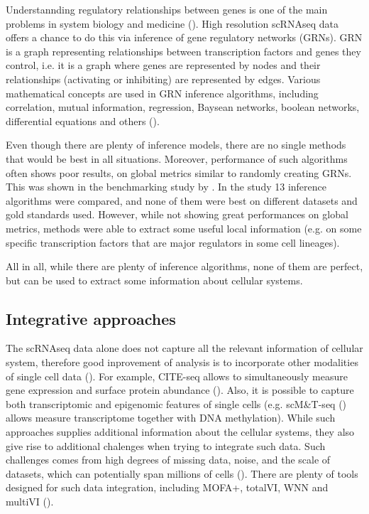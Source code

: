 Understannding regulatory relationships between genes is one of the main problems in system biology and medicine (\cite{Lamoline2024}).
High resolution scRNAseq data offers a chance to do this via inference of gene regulatory networks (GRNs).
GRN is a graph representing relationships between transcription factors and genes they control,
i.e. it is a graph where genes are represented by nodes and their relationships (activating or inhibiting) are represented by edges.
Various mathematical concepts are used in GRN inference algorithms, including
correlation, mutual information, regression, Baysean networks, boolean networks, differential equations and others (\cite{Akers2021}).

Even though there are plenty of inference models, there are no single methods that would be best in all situations.
Moreover, performance of such algorithms often shows poor results, on global metrics similar to randomly creating GRNs.
This was shown in the benchmarking study by \textcite{McCalla2023}.
In the study 13 inference algorithms were compared, and none of them were best on different datasets and gold standards used.
However, while not showing great performances on global metrics, methods were able to extract some useful local information
(e.g. on some specific transcription factors that are major regulators in some cell lineages).

All in all, while there are plenty of inference algorithms, none of them are perfect,
but can be used to extract some information about cellular systems.

\subsection{Integrative approaches}

The scRNAseq data alone does not capture all the relevant information of cellular system,
therefore good inprovement of analysis is to incorporate other modalities of single cell data (\cite{Heumos2023}).
For example, CITE-seq allows to simultaneously measure gene expression and surface protein abundance (\cite{Mercatelli2021}).
Also, it is possible to capture both transcriptomic and epigenomic features of single cells
(e.g. scM\&T-seq (\cite{Angermueller2016}) allows measure transcriptome together with DNA methylation).
While such approaches supplies additional information about the cellular systems,
they also give rise to additional chalenges when trying to integrate such data.
Such challenges comes from high degrees of missing data, noise, and the scale of datasets,
which can potentially span millions of cells (\cite{Argelaguet2020}).
There are plenty of tools designed for such data integration, including MOFA+, totalVI, WNN and multiVI (\cite{Heumos2023}).

